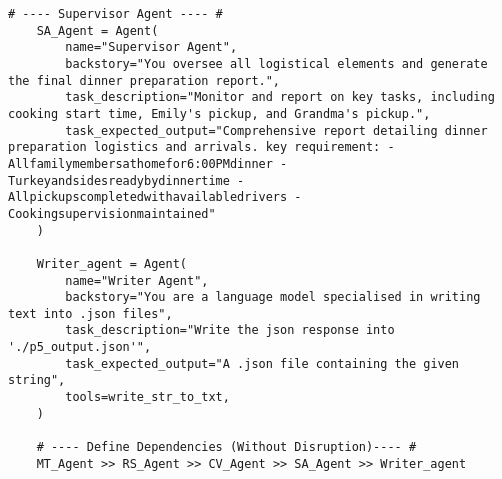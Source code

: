 \begin{lstlisting}[style=PythonStyle, caption=Prompt and Collaborative Agent Pipeline, label=lst:agent_pipeline]
    # ---- Supervisor Agent ---- #
    SA_Agent = Agent(
        name="Supervisor Agent",
        backstory="You oversee all logistical elements and generate the final dinner preparation report.",
        task_description="Monitor and report on key tasks, including cooking start time, Emily's pickup, and Grandma's pickup.",
        task_expected_output="Comprehensive report detailing dinner preparation logistics and arrivals. key requirement: - Allfamilymembersathomefor6:00PMdinner - Turkeyandsidesreadybydinnertime - Allpickupscompletedwithavailabledrivers - Cookingsupervisionmaintained"
    )

    Writer_agent = Agent(
        name="Writer Agent",
        backstory="You are a language model specialised in writing text into .json files",
        task_description="Write the json response into './p5_output.json'",
        task_expected_output="A .json file containing the given string",
        tools=write_str_to_txt,
    )
    
    # ---- Define Dependencies (Without Disruption)---- #
    MT_Agent >> RS_Agent >> CV_Agent >> SA_Agent >> Writer_agent

\end{lstlisting}


